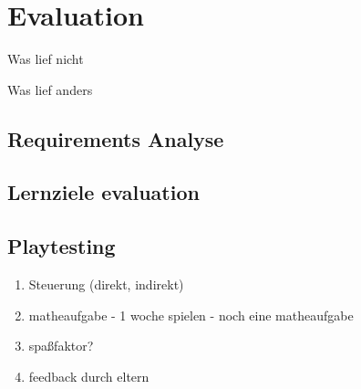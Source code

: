 \section{Evaluation}
	Was lief nicht

	Was lief anders
\subsection{Requirements Analyse}
\subsection{Lernziele evaluation}
\subsection{Playtesting}
	\begin{enumerate}
		\item{ Steuerung (direkt, indirekt) }
		\item{ matheaufgabe - 1 woche spielen - noch eine matheaufgabe }
		\item{ spaßfaktor? }
		\item{ feedback durch eltern }
	\end{enumerate}
